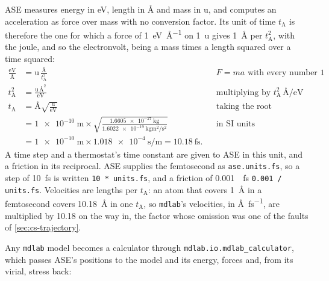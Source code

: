 ASE measures energy in \si{\electronvolt}, length in \si{\angstrom} and
mass in \si{\amu}, and computes an acceleration as force over mass with
no conversion factor. Its unit of time $t_{\mathrm A}$ is therefore the
one for which a force of \SI{1}{\electronvolt\per\angstrom} on
\SI{1}{\amu} gives \SI{1}{\angstrom} per $t_{\mathrm A}^2$, with the
joule, and so the electronvolt, being a mass times a length squared over
a time squared:
\begin{align*}
   \frac{\si{\electronvolt}}{\si{\angstrom}}
      &= \si{\amu}\,\frac{\si{\angstrom}}{t_{\mathrm A}^2}
      && \text{$F = ma$ with every number 1}\\
   t_{\mathrm A}^2 &= \frac{\si{\amu}\,\si{\angstrom}^2}{\si{\electronvolt}}
      && \text{multiplying by $t_{\mathrm A}^2\,\si{\angstrom}/
         \si{\electronvolt}$}\\
   t_{\mathrm A} &= \si{\angstrom}\sqrt{\frac{\si{\amu}}{\si{\electronvolt}}}
      && \text{taking the root}\\
   &= \SI{1e-10}{\metre}\times\sqrt{\frac{\SI{1.6605e-27}{\kilogram}}
        {\SI{1.6022e-19}{\kilogram\metre\squared\per\second\squared}}}
      && \text{in SI units}\\
   &= \SI{1e-10}{\metre}\times\SI{1.018e-4}{\second\per\metre}
      = \SI{10.18}{\femto\second} .
\end{align*}
A time step and a thermostat's time constant are given to ASE in this
unit, and a friction in its reciprocal. ASE supplies the femtosecond as
\texttt{ase.units.fs}, so a step of \SI{10}{\femto\second} is written
\texttt{10 * units.fs}, and a friction of \SI{0.001}{\per\femto\second}
\texttt{0.001 / units.fs}. Velocities are lengths per $t_{\mathrm A}$: an
atom that covers \SI{1}{\angstrom} in a femtosecond covers
\SI{10.18}{\angstrom} in one $t_{\mathrm A}$, so \texttt{mdlab}'s
velocities, in \si{\angstrom\per\femto\second}, are multiplied by 10.18 on
the way in, the factor whose omission was one of the faults of
\cref{sec:cs-trajectory}.

Any \texttt{mdlab} model becomes a calculator through
\texttt{mdlab.io.mdlab\_calculator}, which passes ASE's positions to the
model and its energy, forces and, from its virial, stress back:

